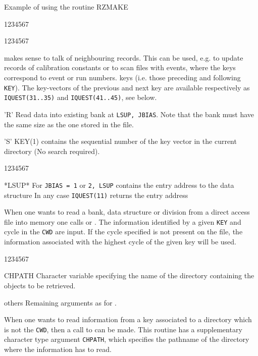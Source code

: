\begin{XMPt}{Example of using the routine RZMAKE}
\begin{DLtt}{1234567}
\begin{DLtt}{1234567}
\begin{DLtt}{12}
{makes sense to talk of neighbouring records.
This can be used, e.g. to update records of calibration
constants or to scan files with events, where the keys correspond to
event or run numbers.}
keys (i.e. those preceding and following {\tt KEY}).
\newline The key-vectors of the previous and next key are available
respectively as {\tt IQUEST(31..35)} and {\tt IQUEST(41..45)}, see below.
\item['R']Read data into existing bank at {\tt LSUP, JBIAS}. Note that the bank
must have the same size as the one stored in the file.
\item['S']KEY(1) contains the sequential number of the key vector
in the current directory (No search required).
\end{DLtt}
\end{DLtt}
\end{DLtt}
\Odesc
\begin{DLtt}{1234567}
\item[*LSUP*]For {\tt JBIAS = 1} or {\tt 2, LSUP} contains
the entry address to the data structure
\newline In any case {\tt IQUEST(11)} returns the entry address
\end{DLtt}
\par 
When one wants to read a bank, data structure or division from
a direct access file into memory one calls  or .
The information identified by a given {\tt KEY} and cycle in the {\tt CWD} are
input. If the cycle specified is not present on the file, the information
associated with the highest cycle of the given key will be used.
\Idesc
\begin{DLtt}{1234567}
\item[CHPATH] Character variable specifying the name of the
directory containing the objects to be retrieved.
\item[others] Remaining arguments as for .
\end{DLtt}
\par
When one wants to read information from a key associated to a directory
which is not the {\tt CWD}, then a call to  can be made.
This routine has a supplementary character type argument {\tt CHPATH}, which
specifies the pathname
of the directory where the information has to read.

\end{XMPt}
